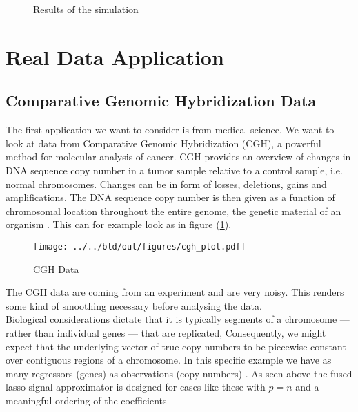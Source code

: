 \documentclass{article}
\theoremstyle{definition}
\begin{document}


\begin{figure}
	
	\caption{Results of the simulation}
\end{figure}



\section{Real Data Application}

\subsection{Comparative Genomic Hybridization Data}
The first application we want to consider is from medical science. We want to look at data from Comparative Genomic Hybridization (CGH), a powerful method for molecular analysis of cancer.    
CGH provides an overview of changes in DNA sequence copy number in a tumor sample 
relative to a control sample, i.e. normal chromosomes. Changes can be in form of losses, deletions, gains and amplifications\citep{cghmain}. The DNA  sequence copy number is then given as a function of chromosomal location throughout the entire genome, the genetic material of an organism \citep{cghsecond}. This can for example look as in figure (\ref{cghdata}).

\begin{figure}
	\centering
	\texttt{[image: ../../bld/out/figures/cgh\_plot.pdf]}
	\caption{CGH Data}
	\label{cghdata}
\end{figure}

The CGH data are coming from an experiment and are very noisy. This renders some kind of smoothing necessary before analysing the data. \\
Biological considerations dictate that it is typically segments of a chromosome — rather than individual genes — that are replicated, Consequently, we might expect that the underlying vector of true copy numbers to be piecewise-constant over contiguous regions of a chromosome.
In this specific example we have as many regressors (genes) as observations (copy numbers) \citep{sparsity}.
As seen above the fused lasso signal approximator is designed for cases like these with $ p = n$ and a meaningful ordering of the coefficients
\end{document}
